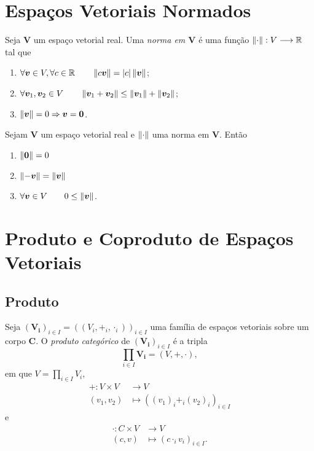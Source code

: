 \section{Espaços Vetoriais Normados}

\begin{defi}
	Seja $\bm V$ um espaço vetorial real. Uma \emph{norma em $\bm V$} é uma função $\left\Vert{\cdot}\right\Vert: V \longrightarrow \mathbb{R}$ tal que
	\begin{enumerate}
	\item $\forall \bm v \in V, \forall c \in \mathbb{R} \qquad \left\Vert{c \bm v}\right\Vert = |c|\left\Vert{\bm v}\right\Vert$;
	\item $\forall \bm v_1, \bm v_2 \in V \qquad \left\Vert{\bm v_1 + \bm v_2}\right\Vert \leq \left\Vert{\bm v_1}\right\Vert + \left\Vert{\bm v_2}\right\Vert$;
	\item $\left\Vert{\bm v}\right\Vert = 0 \Rightarrow \bm v = \bm 0$.
	\end{enumerate}
\end{defi}

\begin{prop}
	Sejam $\bm V$ um espaço vetorial real e $\left\Vert{\cdot}\right\Vert$ uma norma em $\bm V$. Então
	\begin{enumerate}
	\item $\left\Vert{\bm 0}\right\Vert = 0$
	\item $\left\Vert{- \bm v}\right\Vert = \left\Vert{\bm v}\right\Vert$
	\item $\forall \bm v \in V \qquad 0 \leq \left\Vert{\bm v}\right\Vert$.
	\end{enumerate}
\end{prop}

\cleardoublepage
\section{Produto e Coproduto de Espaços Vetoriais}

\subsection{Produto}

\begin{defi}
Seja $(\bm{V_i})_{i \in I} = ((V_i,+_i,\cdot_i))_{i \in I}$ uma família de espaços vetoriais sobre um corpo $\bm C$. O \emph{produto categórico} de $(\bm{V_i})_{i \in I}$ é a tripla
	\begin{equation*}
	\prod_{i \in I} \bm{V_i} = (V,+,\cdot),
	\end{equation*}
em que $V = \prod_{i \in I} V_i$,
	\begin{align*}
	+: V \times V &\to V \\
			(v_1,v_2) &\mapsto ((v_1)_i +_i (v_2)_i)_{i \in I}
	\end{align*}
e
	\begin{align*}
	\cdot: C \times V &\to V \\
			(c,v) &\mapsto (c \cdot_i v_i)_{i \in I}.
	\end{align*}
\end{defi}

